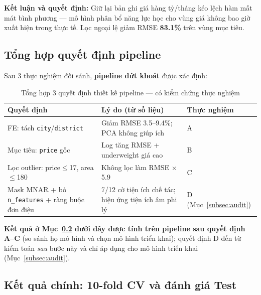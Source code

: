 \textbf{Kết luận và quyết định:}
Giữ lại bản ghi giá hàng tỷ/tháng kéo lệch hàm mất mát bình phương —
mô hình phân bổ năng lực học cho vùng giá không bao giờ xuất hiện trong thực tế.
Lọc ngoại lệ giảm RMSE \textbf{83.1\%} trên vùng mục tiêu.


\subsection{Tổng hợp quyết định pipeline}
\label{subsec:pipeline_summary}

Sau 3 thực nghiệm đối sánh, \textbf{pipeline dứt khoát} được xác định:

\begin{table}[H]
  \centering
  \caption{Tổng hợp 3 quyết định thiết kế pipeline — có kiểm chứng thực nghiệm}
  \label{tab:pipeline}
  \begin{tabularx}{\textwidth}{@{}l X l@{}}
    \toprule
    \textbf{Quyết định} & \textbf{Lý do (từ số liệu)} & \textbf{Thực nghiệm} \\
    \midrule
    FE: tách \texttt{city}/\texttt{district} & Giảm RMSE 3.5--9.4\%; PCA không giúp ích & A \\
    Mục tiêu: \texttt{price} gốc & Log tăng RMSE + underweight giá cao & B \\
    Lọc outlier: price$\leq$17, area$\leq$180 & Không lọc làm RMSE $\times$5.9 & C \\
    Mask MNAR + bỏ \texttt{n\_features} + ràng buộc đơn điệu &
      7/12 cờ tiện ích chế tác; hiệu ứng tiện ích âm phi lý & D (Mục~\ref{subsec:audit}) \\
    \bottomrule
  \end{tabularx}
\end{table}

\textbf{Kết quả ở Mục~\ref{subsec:main_results} dưới đây được tính trên pipeline sau
quyết định A--C} (so sánh họ mô hình và chọn mô hình triển khai); quyết định D đến từ
kiểm toán \textit{sau} bước này và chỉ áp dụng cho mô hình triển khai
(Mục~\ref{subsec:audit}).

\subsection{Kết quả chính: 10-fold CV và đánh giá Test}
\label{subsec:main_results}

